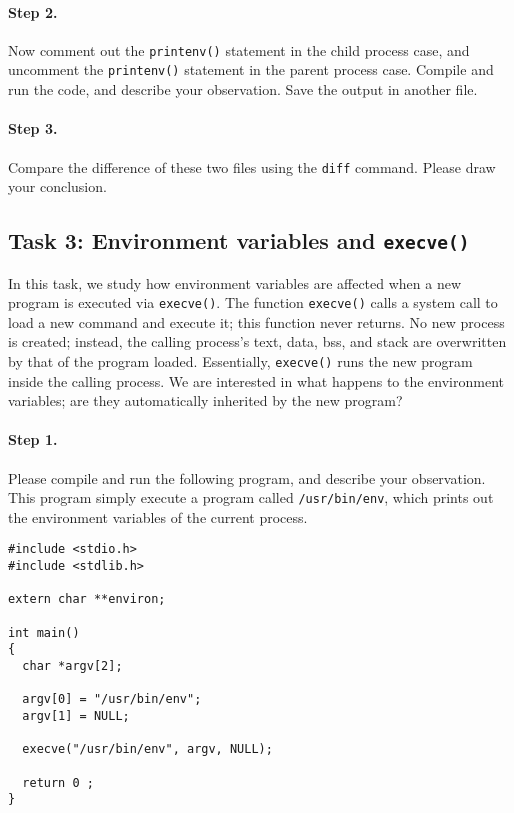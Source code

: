 \paragraph{Step 2.} Now comment out the {\tt printenv()} statement in
the child process case, and uncomment the {\tt printenv()} statement in
the parent process case. Compile and run the code, and describe your 
observation. Save the output in another file.


\paragraph{Step 3.} Compare the difference of these two files using 
the {\tt diff} command. Please draw your conclusion.



\subsection{Task 3: Environment variables and {\tt execve()}}

In this task, we study how environment variables are affected
when a new program is 
executed via {\tt execve()}. The 
function {\tt execve()} calls a system call to load 
a new command and execute it; this function never returns. 
No new process is created; instead, the calling 
process's text,  data, bss, and stack  are overwritten by that of 
the program loaded. Essentially, {\tt execve()} runs the new program inside
the calling process. We are interested in what happens to the 
environment variables; are they automatically inherited by the 
new program?


\paragraph{Step 1.} Please compile and run the following
program, and describe your observation. This program simply execute
a program called {\tt /usr/bin/env}, which prints out the environment
variables of the current process.

\begin{Verbatim}[frame=single]
#include <stdio.h>
#include <stdlib.h>

extern char **environ;

int main()
{
  char *argv[2];

  argv[0] = "/usr/bin/env"; 
  argv[1] = NULL;

  execve("/usr/bin/env", argv, NULL);

  return 0 ;
}
\end{Verbatim}


